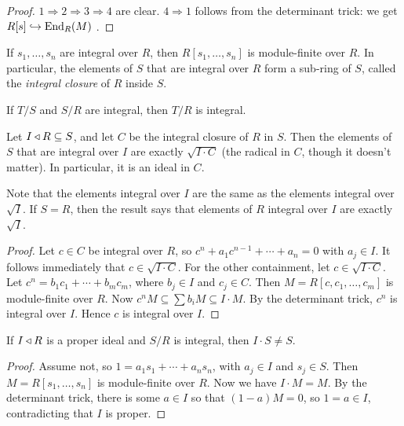  \begin{proof}
   $1\Rightarrow 2\Rightarrow 3\Rightarrow 4$ are clear. $4\Rightarrow 1$ follows from
   the determinant trick: we get $R[s]\hookrightarrow \operatorname{End}_R(M)$ .
 \end{proof}
 \begin{corollary}
   If $s_1,\dots, s_n$ are integral over $R$, then $R[s_1,\dots, s_n]$ is module-finite
   over $R$. In particular, the elements of $S$ that are integral over $R$ form a
   sub-ring of $S$, called the \emph{integral closure} of $R$ inside $S$.
 \end{corollary}
 \begin{corollary}
   If $T/S$ and $S/R$ are integral, then $T/R$ is integral.
 \end{corollary}
 \begin{proposition}
   Let $I\triangleleft R\subseteq S$, and let $C$ be the integral closure of $R$ in $S$. Then the
   elements of $S$ that are integral over $I$ are exactly $\sqrt{I\cdot C}$ (the radical
   in $C$, though it doesn't matter). In particular, it is an ideal in $C$.
 \end{proposition}
 \begin{remark}
   Note that the elements integral over $I$ are the same as the elements integral over
   $\sqrt I$. If $S=R$, then the result says that elements of $R$ integral over $I$ are
   exactly $\sqrt I$.
 \end{remark}
 \begin{proof}
   Let $c\in C$ be integral over $R$, so $c^n+a_1c^{n-1}+\cdots +a_n=0$ with $a_j\in I$.
   It follows immediately that $c\in \sqrt {I\cdot C}$. For the other containment, let
   $c\in \sqrt {I\cdot C}$. Let $c^n=b_1c_1+\cdots + b_mc_m$, where $b_j\in I$ and
   $c_j\in C$. Then $M=R[c,c_1,\dots, c_m]$ is module-finite over $R$. Now $c^nM\subseteq
   \sum b_iM\subseteq I\cdot M$. By the determinant trick, $c^n$ is integral over $I$.
   Hence $c$ is integral over $I$.
 \end{proof}
 \begin{lemma}
   If $I\triangleleft R$ is a proper ideal and $S/R$ is integral, then $I\cdot S\neq S$.
 \end{lemma}
 \begin{proof}
   Assume not, so $1=a_1s_1+\cdots+a_ns_n$, with $a_j\in I$ and $s_j\in S$. Then
   $M=R[s_1,\dots, s_n]$ is module-finite over $R$. Now we have $I\cdot M=M$. By the
   determinant trick, there is some $a\in I$ so that $(1-a)M=0$, so $1=a\in I$,
   contradicting that $I$ is proper.
 \end{proof}
